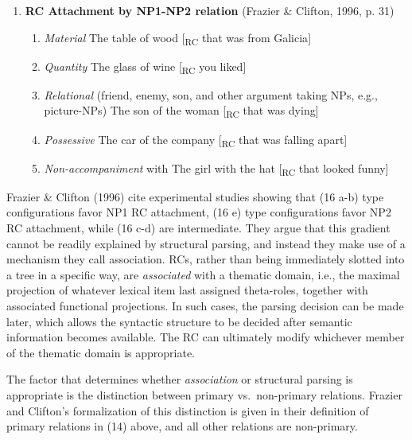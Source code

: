 \documentclass[12pt,oneside]{book}
\providecommand{\tightlist}{%
  \setlength{\itemsep}{0pt}\setlength{\parskip}{0pt}}
\begin{document}
\begin{enumerate}
\def\labelenumi{(\arabic{enumi})}
\setcounter{enumi}{15}
\tightlist
\item
  \textbf{RC Attachment by NP1-NP2 relation} (Frazier \& Clifton, 1996, p. 31) \linebreak\nopagebreak

  \begin{enumerate}
  \def\labelenumii{\alph{enumii})}
  \tightlist
  \item
    \emph{Material} \linebreak\nopagebreak
    The table of wood {[}\textsubscript{RC} that was from Galicia{]}
  \item
    \emph{Quantity} \linebreak\nopagebreak
    The glass of wine {[}\textsubscript{RC} you liked{]}
  \item
    \emph{Relational} (friend, enemy, son, and other argument taking NPs, e.g., picture-NPs) \linebreak\nopagebreak
    The son of the woman {[}\textsubscript{RC} that was dying{]}
  \item
    \emph{Possessive} \linebreak\nopagebreak
    The car of the company {[}\textsubscript{RC} that was falling apart{]}
  \item
    \emph{Non-accompaniment} with \linebreak\nopagebreak
    The girl with the hat {[}\textsubscript{RC} that looked funny{]}
  \end{enumerate}
\end{enumerate}

Frazier \& Clifton (1996) cite experimental studies showing that (16 a-b) type configurations favor NP1 RC attachment, (16 e) type configurations favor NP2 RC attachment, while (16 c-d) are intermediate. They argue that this gradient cannot be readily explained by structural parsing, and instead they make use of a mechanism they call association. RCs, rather than being immediately slotted into a tree in a specific way, are \emph{associated} with a thematic domain, i.e., the maximal projection of whatever lexical item last assigned theta-roles, together with associated functional projections. In such cases, the parsing decision can be made later, which allows the syntactic structure to be decided after semantic information becomes available. The RC can ultimately modify whichever member of the thematic domain is appropriate.

The factor that determines whether \emph{association} or structural parsing is appropriate is the distinction between primary vs.~non-primary relations. Frazier and Clifton's formalization of this distinction is given in their definition of primary relations in (14) above, and all other relations are non-primary.
\end{document}
